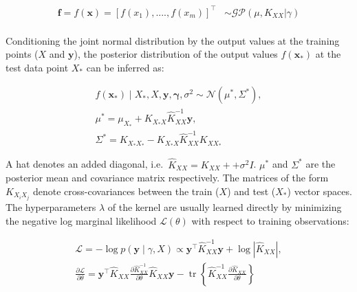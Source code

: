 \documentclass[a4paper, nobind]{templates/cdethesis}
\begin{document}
\begin{equation}
\begin{aligned}
\mathbf{f} = f(\mathbf{x}) = [f(x_1), ...., f(x_m)]^\top & \sim 
\mathcal{GP}\left(
  \mu, K_{XX}|\gamma\right
) \\
\end{aligned} \label{eq:1}
\end{equation}

Conditioning the joint normal distribution by the output values at the training points
(\(X\) and \(\mathbf{y}\)), the posterior distribution of the output values \(f(\mathbf{x}_{*})\) at the test data point \(X_*\) can be inferred as:

\begin{equation}
\begin{aligned}
f(\mathbf{x}_{*}) \mid X_{*}, X, \mathbf{y}, \boldsymbol{\gamma}, \sigma^{2} \sim \mathcal{N}(\mu^{*}, \Sigma^{*}), \\
\mu^{*} = \mu_{X_*} + K_{X_*X}\widehat{K}_{XX}^{-1}\mathbf{y}, \\
\Sigma^{*} = K_{X_*X_*} - K_{X_*X}\widehat{K}_{XX}^{-1}K_{XX_*}
\end{aligned} \label{eq:2}
\end{equation}

A hat denotes an added diagonal, i.e.~\(\widehat{K}_{XX} = K_{XX} + + \sigma^{2}I\). \(\mu^{*}\) and \(\Sigma^{*}\) are the posterior mean and covariance matrix respectively. The matrices of the form \(K_{X_iX_j}\) denote cross-covariances between the train (\(X\)) and test (\(X_*\)) vector spaces. The hyperparameters \(\lambda\) of the kernel are usually learned directly by minimizing the negative log marginal likelihood \(\mathcal{L}(\theta)\) with respect to training observations:

\begin{equation}
\begin{aligned}
\mathcal{L} = - \log p(\mathbf{y} \mid \gamma, X) \propto \mathbf{y}^{\top} \widehat{K}_{XX}^{-1} \mathbf{y} + \log \left|\widehat{K}_{X X}\right|, \\
\frac{\partial \mathcal{L}}{\partial \theta} = \mathbf{y}^{\top} \widehat{K}_{XX} \frac{\partial \widehat{K}_{X X}^{-1}}{\partial \theta} \widehat{K}_{X X} \mathbf{y}-\operatorname{tr}\left\{\widehat{K}_{X X}^{-1} \frac{\partial \widehat{K}_{XX}}{\partial \theta}\right\}
\label{eq:3}
\end{aligned}
\end{equation}
\end{document}
